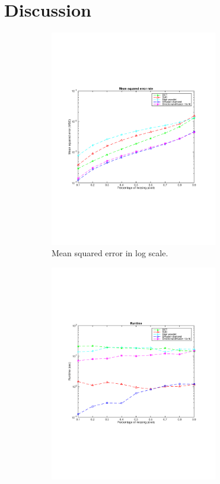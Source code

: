\section{Discussion}
\label{sec:discussion}

\begin{figure}
	\centering
	\begin{subfigure}[b]{0.49\textwidth}
		\centering
		\includegraphics[clip, trim=2cm 7cm 2cm 6cm, width=0.803\textwidth]{figures/mse_vector}
		\caption{Mean squared error in log scale.}
		\label{fig:err_random}
	\end{subfigure}
	\begin{subfigure}[b]{0.49\textwidth}
		\centering
		\includegraphics[clip, trim=2cm 7cm 2cm 6cm, width=0.803\textwidth]{figures/runtime_vector}

\end{subfigure}
\end{figure}
